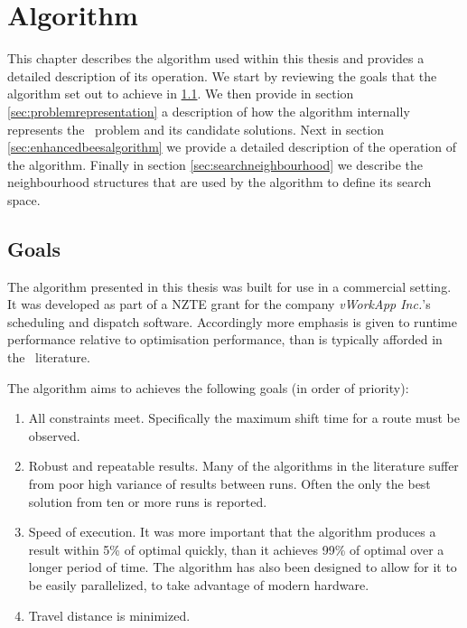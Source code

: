 
\chapter{Algorithm}

This chapter describes the algorithm used within this thesis and provides a detailed description of its operation. We start by reviewing the goals that the algorithm set out to achieve in \ref{sec:goals}. We then provide in section  \ref{sec:problemrepresentation} a description of how the algorithm internally represents the \VRP\ problem and its candidate solutions. Next in section \ref{sec:enhancedbeesalgorithm} we provide a detailed description of the operation of the algorithm. Finally in section \ref{sec:searchneighbourhood} we describe the neighbourhood structures that are used by the algorithm to define its search space.

\section{Goals}
\label{sec:goals}

The algorithm presented in this thesis was built for use in a commercial setting. It was developed as part of a NZTE grant for the company \emph{vWorkApp Inc.}'s scheduling and dispatch software. Accordingly more emphasis is given to runtime performance relative to optimisation performance, than is typically afforded in the \VRP\ literature.
 
The algorithm aims to achieves the following goals (in order of priority):

\begin{enumerate}
   \item All constraints meet. Specifically the maximum shift time for a route must be observed.
   \item Robust and repeatable results. Many of the algorithms in the literature suffer from poor high variance of results between runs. Often the only the best solution from ten or more runs is reported.
   \item Speed of execution. It was more important that the algorithm produces a result within 5\% of optimal quickly, than it achieves 99\% of optimal over a longer period of time. The algorithm has also been designed to allow for it to be easily parallelized, to take advantage of modern hardware.
   \item Travel distance is minimized.
\end{enumerate}

